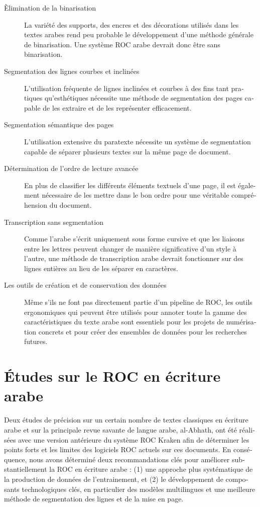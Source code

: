 \begin{french}
\begin{description}
	\item[Èlimination de la binarisation] La variété des supports, des encres et des décorations utilisés
		dans les textes arabes rend peu probable le développement d'une
		méthode générale de binarisation. Une système ROC arabe devrait
		donc être sans binarisation.
	\item[Segmentation des lignes courbes et inclinées] L'utilisation
		fréquente de lignes inclinées et courbes à des fins tant
		pratiques qu'esthétiques nécessite une méthode de segmentation
		des pages capable de les extraire et de les représenter
		efficacement.
	\item[Segmentation sémantique des pages] L'utilisation extensive du
		paratexte nécessite un système de segmentation capable de
		séparer plusieurs textes sur la même page de document.
	\item[Détermination de l'ordre de lecture avancée] En plus de
		classifier les différents éléments textuels d'une page, il est
		également nécessaire de les mettre dans le bon ordre pour une
		véritable compréhension du document.
	\item[Transcription sans segmentation] Comme l'arabe s'écrit uniquement
		sous forme cursive et que les liaisons entre les lettres
		peuvent changer de manière significative d'un style à l'autre,
		une méthode de transcription arabe devrait fonctionner sur des
		lignes entières au lieu de les séparer en caractères.
	\item[Les outils de création et de conservation des données]
		Même s'ils ne font pas directement partie d'un pipeline de ROC,
		les outils ergonomiques qui peuvent être utilisés pour annoter
		toute la gamme des caractéristiques du texte arabe sont
		essentiels pour les projets de numérisation concrets et pour
		créer des ensembles de données pour les recherches futures.
\end{description}

\section{Études sur le ROC en écriture arabe}

Deux études de précision sur un certain nombre de textes classiques en écriture
arabe et sur la principale revue savante de langue arabe, al-Abhath, ont été
réalisées avec une version antérieure du système ROC Kraken afin de déterminer
les points forts et les limites des logiciels ROC actuels sur ces documents. En
conséquence, nous avons déterminé deux recommandations clés pour améliorer
substantiellement la ROC en écriture arabe : (1) une approche plus systématique
de la production de données de l'entrainement, et (2) le développement de
composants technologiques clés, en particulier des modèles multilingues et une
meilleure méthode de segmentation des lignes et de la mise en page.


\end{french}
